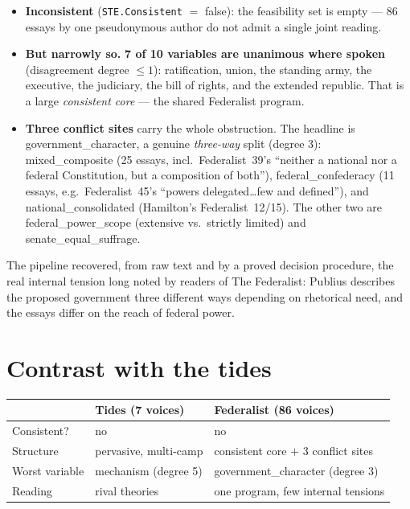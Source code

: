 \documentclass[11pt]{article}
\newcommand{\lean}[1]{\texttt{#1}}
\newcommand{\vv}[1]{\textsf{\small #1}}
\begin{document}
\begin{itemize}
\item \textbf{Inconsistent} (\lean{STE.Consistent} $=$ \textsf{false}): the
  feasibility set is empty --- 86 essays by one pseudonymous author do not
  admit a single joint reading.
\item \textbf{But narrowly so.} \textbf{7 of 10 variables are unanimous
  where spoken} (disagreement degree $\le 1$): ratification, union, the
  standing army, the executive, the judiciary, the bill of rights, and the
  extended republic. That is a large \emph{consistent core} --- the shared
  Federalist program.
\item \textbf{Three conflict sites} carry the whole obstruction. The
  headline is \vv{government\_character}, a genuine \emph{three-way} split
  (degree 3): \vv{mixed\_composite} (25 essays, incl.\ Federalist~39's
  ``neither a national nor a federal Constitution, but a composition of
  both''), \vv{federal\_confederacy} (11 essays, e.g.\ Federalist~45's
  ``powers delegated\dots few and defined''), and
  \vv{national\_consolidated} (Hamilton's Federalist~12/15). The other two
  are \vv{federal\_power\_scope} (extensive vs.\ strictly limited) and
  \vv{senate\_equal\_suffrage}.
\end{itemize}

The pipeline recovered, from raw text and by a proved decision procedure,
the real internal tension long noted by readers of The Federalist: Publius
describes the proposed government three different ways depending on
rhetorical need, and the essays differ on the reach of federal power.

\section{Contrast with the tides}

\begin{center}\small
\begin{tabular}{@{}l l l@{}}
\toprule
 & Tides (7 voices) & Federalist (86 voices) \\
\midrule
Consistent? & no & no \\
Structure & pervasive, multi-camp & consistent core $+$ 3 conflict sites \\
Worst variable & mechanism (degree 5) & government\_character (degree 3) \\
Reading & rival theories & one program, few internal tensions \\
\bottomrule
\end{tabular}
\end{center}
\end{document}
